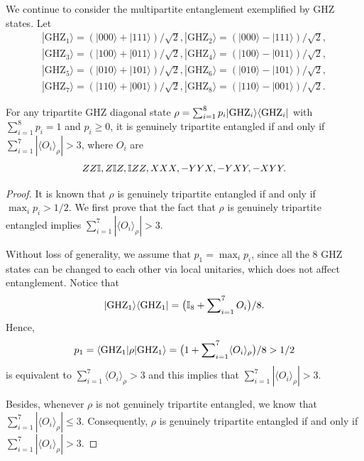 We continue to consider the multipartite entanglement exemplified by GHZ states.
Let
\begin{align}
|\text{GHZ}_1\rangle = (|000\rangle + |111\rangle)/\sqrt{2},
|\text{GHZ}_2\rangle = (|000\rangle - |111\rangle)/\sqrt{2},\nonumber\\
|\text{GHZ}_3\rangle = (|100\rangle + |011\rangle)/\sqrt{2},
|\text{GHZ}_4\rangle = (|100\rangle - |011\rangle)/\sqrt{2},\nonumber\\
|\text{GHZ}_5\rangle = (|010\rangle + |101\rangle)/\sqrt{2},
|\text{GHZ}_6\rangle = (|010\rangle - |101\rangle)/\sqrt{2},\nonumber\\
|\text{GHZ}_7\rangle = (|110\rangle + |001\rangle)/\sqrt{2},
|\text{GHZ}_8\rangle = (|110\rangle - |001\rangle)/\sqrt{2}.
\end{align}
\begin{theorem}
	For any tripartite GHZ diagonal state $\rho = \sum_{i=1}^8 p_i |{\rm GHZ}_i\rangle\langle {\rm GHZ}_i|$ with $\sum_{i=1}^8 p_i = 1$ and $p_i\ge 0$, it is genuinely tripartite entangled if and only if  $\sum_{i=1}^7 |\langle O_i\rangle_{\rho}| > 3$, where $O_i$ are  
\begin{equation}\label{eq:stabilizer_inappendix}
	Z Z\mathbb{I}, Z\mathbb{I} Z, \mathbb{I} Z Z, XXX,-YYX, -YXY, -XYY.
\end{equation}
\end{theorem}
\begin{proof}
	It is known that $\rho$ is genuinely tripartite entangled if and only if $\max_i p_i > 1/2$. We first prove that the fact that $\rho$ is genuinely tripartite entangled implies $\sum_{i=1}^7 |\langle O_i\rangle_{\rho} | > 3$.

	Without loss of generality, we assume that $p_1 = \max_i p_i$, since all the $8$ GHZ states can be changed to each other via local unitaries, which does not affect entanglement.
	Notice that 
	\begin{equation}
		|{\rm GHZ}_1\rangle\langle {\rm GHZ}_1| = \big(\mathbb{I}_8 + \sum\nolimits_{i=1}^7 O_i\big)/8.
	\end{equation}
	Hence,
	\begin{equation}
		p_1 = \langle {\rm GHZ}_1|\rho|{\rm GHZ}_1\rangle = \big(1 + \sum\nolimits_{i=1}^7 \langle O_i\rangle_{\rho}\big)/8 > 1/2
	\end{equation}
	is equivalent to $\sum\nolimits_{i=1}^7 \langle O_i\rangle_{\rho} > 3$ and this implies that $\sum\nolimits_{i=1}^7 |\langle O_i\rangle_{\rho}| > 3$.

	Besides, whenever $\rho$ is not genuinely tripartite entangled, we know that $\sum\nolimits_{i=1}^7 |\langle O_i\rangle_{\rho}| \le 3$.
	Consequently, $\rho$ is genuinely tripartite entangled if and only if $\sum\nolimits_{i=1}^7 |\langle O_i\rangle_{\rho}| > 3$.
\end{proof}
